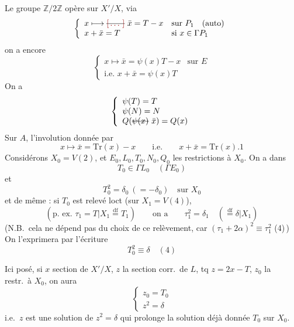 \documentclass[11pt,a4paper]{article}
\begin{document}
Le groupe $\mathbb{Z}/2\mathbb{Z}$ opère sur $X'/X$, via
\[
  \left\{\begin{array}{ll}
    x \longmapsto \text{\struck{\ill{}}}\ \bar{x} = T - x & \text{sur } P_{1} \quad (\text{auto})\\
    x + \bar{x} = T & \text{si } x \in \Gamma P_{1}
  \end{array}\right.
\]
on a encore
\[
  \left\{\begin{array}{ll}
    x \longmapsto \bar{x} = \psi(x)T - x & \text{sur } E\\
    \text{i.e.\ } x + \bar{x} = \psi(x)T &
  \end{array}\right.
\]
On a
\[
  \left\{\begin{array}{l}
    \psi(T) = T\\
    \psi(N) = N\\
    Q(\text{\struck{$\psi(x)$}}\ \bar{x}) = Q(x)
  \end{array}\right.
\]
Sur $A$, l'involution donnée par
\[
  x \longmapsto \bar{x} = \mathrm{Tr}(x) - x \qquad\text{i.e.}\qquad x + \bar{x} = \mathrm{Tr}(x).1
\]
Considérons $X_{0} = V(2)$,  et $E_{0}, L_{0}, T_{0}, N_{0}, Q_{0}$ les restrictions à $X_{0}$. On a  dans
\[
  T_{0} \in \Gamma L_{0} \quad (\Gamma E_{0})
\]
et
\[
  T_{0}^{2} = \delta_{0} \ (= -\delta_{0}) \quad\text{sur } X_{0}
\]
et de même : si $T_{0}$ est relevé loct  (sur $X_{1} = V(4)$), \struck{\ill{}}
\[
  (\text{p.\ ex.\ } \tau_{1} = T|X_{1} \overset{\mathrm{df}}{=} T_{1})
  \qquad\text{on a}\qquad
  \tau_{1}^{2} = \delta_{1} \quad (\overset{\mathrm{df}}{=} \delta|X_{1})
\]
(N.B.\ cela ne dépend pas du choix de ce relèvement, car $(\tau_{1} + 2\alpha)^{2} \equiv \tau_{1}^{2}$ (4)\,) On l'exprimera par l'écriture
\[
  \boxed{T_{0}^{2} \equiv \delta \quad (4)}
\]

Ici posé, si $x$ section de $X'/X$, $z$ la section corr.\ de $L$, tq $z = 2x - T$,  $z_{0}$ la restr.\ à $X_{0}$, on aura
\[
  \left\{\begin{array}{l} z_{0} = T_{0} \\ z^{2} = \delta \end{array}\right.
\]
i.e.\ $z$ est une solution de $z^{2} = \delta$  qui prolonge la solution déjà donnée $T_{0}$ sur $X_{0}$.
\end{document}
